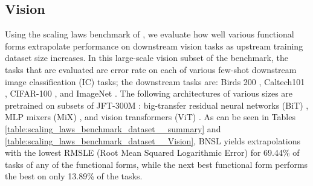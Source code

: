 \documentclass{article} %
\begin{document}
\FloatBarrier
\vspace{-3.6mm}
\subsection{Vision}
\vspace{-3.9mm}
\label{section:scaling_benchmark__vision}


Using the scaling laws benchmark of \cite{Alabdulmohsi2022revisiting}, we evaluate how well various functional forms extrapolate performance on downstream vision tasks as upstream training dataset size increases. In this large-scale vision subset of the benchmark, the tasks that are evaluated are error rate on each of various few-shot downstream image classification (IC) tasks; the downstream tasks are: Birds 200 \citep{welinder2010caltech}, Caltech101 \citep{fei2004learning}, CIFAR-100 \citep{krizhevsky2009learning}, and ImageNet \citep{deng2009imagenet}. The following architectures of various sizes are pretrained on subsets of JFT-300M \citep{sun2017revisiting}: big-transfer residual neural networks (BiT) \citep{kolesnikov2020big}, MLP mixers (MiX) \citep{tolstikhin2021mlp}, and vision transformers (ViT) \citep{dosovitskiy2020image}. As can be seen in Tables  \ref{table:scaling_laws_benchmark_dataset__summary} and \ref{table:scaling_laws_benchmark_dataset__Vision}, BNSL yields extrapolations with the lowest RMSLE (Root Mean Squared Logarithmic Error) for 69.44\% of tasks of any of the functional forms, while the next best functional form performs the best on only 13.89\% of the tasks.

\vspace{-2.0mm}
\end{document}
